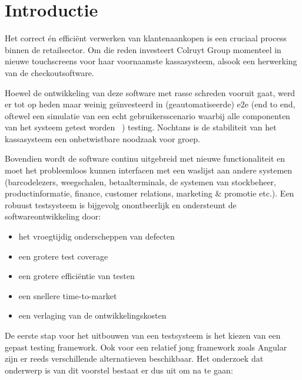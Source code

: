 
\section{Introductie} %
\label{sec:introductie}
Het correct én efficiënt verwerken van klantenaankopen is een cruciaal process binnen de retailsector. Om die reden investeert Colruyt Group momenteel in nieuwe touchscreens voor haar voornaamste kassasysteem, alsook een herwerking van de checkoutsoftware.

Hoewel de ontwikkeling van deze software met rasse schreden vooruit gaat, werd er tot op heden maar weinig geïnvesteerd in (geautomatiseerde) e2e (end to end, oftewel een simulatie van een echt gebruikersscenario waarbij alle componenten van het systeem getest worden ~\cite{SoftwareTestingHelp2019}) testing. Nochtans is de stabiliteit van het kassasysteem een onbetwistbare noodzaak voor groep.

Bovendien wordt de software continu uitgebreid met nieuwe functionaliteit en moet het probleemloos kunnen interfacen met een waslijst aan andere systemen (barcodelezers, weegschalen, betaalterminals, de systemen van stockbeheer, productinformatie, finance, customer relations, marketing \& promotie etc.).
\vspace{\baselineskip}
Een robuust testsysteem is bijgevolg onontbeerlijk en ondersteunt de softwareontwikkeling door:

\begin{itemize}
  \item het vroegtijdig onderscheppen van defecten
  \item een grotere test coverage
  \item een grotere efficiëntie van testen
  \item een snellere time-to-market
  \item een verlaging van de ontwikkelingskosten
\end{itemize}

De eerste stap voor het uitbouwen van een testsysteem is het kiezen van een gepast testing framework. Ook voor een relatief jong framework zoals Angular zijn er reeds verschillende alternatieven beschikbaar.
\vspace{\baselineskip}
Het onderzoek dat onderwerp is van dit voorstel bestaat er dus uit om na te gaan:

